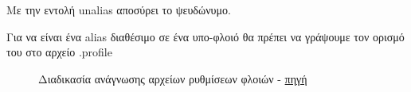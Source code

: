 Mε την εντολή unalias αποσύρει το ψευδώνυμο.

Για να είναι ένα alias διαθέσιμο σε ένα υπο-φλοιό θα πρέπει να γράψουμε τον ορισμό του στο αρχείο .profile


\begin{figure}[ht]
	\centering
	\caption{Διαδικασία ανάγνωσης αρχείων ρυθμίσεων φλοιών - \href{https://zwischenzugs.files.wordpress.com/}{πηγή}}
	\label{fig:startup_scripts}
\end{figure} 

